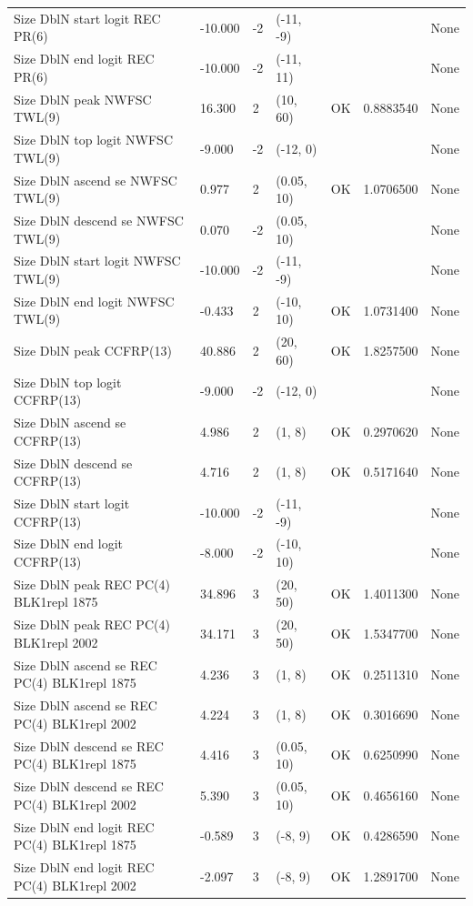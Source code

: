 \documentclass[
  english,
  a4paper,
]{article}
\begin{document}
\begin{landscape}
\begin{longtable}[t]{>{\raggedright\arraybackslash}p{8.5cm}lllll>{\raggedright\arraybackslash}p{4cm}}
Size DblN start logit REC PR(6) & -10.000 & -2 & (-11, -9) &  &  & None\\
Size DblN end logit REC PR(6) & -10.000 & -2 & (-11, 11) &  &  & None\\
Size DblN peak NWFSC TWL(9) & 16.300 & 2 & (10, 60) & OK & 0.8883540 & None\\
Size DblN top logit NWFSC TWL(9) & -9.000 & -2 & (-12, 0) &  &  & None\\
Size DblN ascend se NWFSC TWL(9) & 0.977 & 2 & (0.05, 10) & OK & 1.0706500 & None\\
Size DblN descend se NWFSC TWL(9) & 0.070 & -2 & (0.05, 10) &  &  & None\\
Size DblN start logit NWFSC TWL(9) & -10.000 & -2 & (-11, -9) &  &  & None\\
Size DblN end logit NWFSC TWL(9) & -0.433 & 2 & (-10, 10) & OK & 1.0731400 & None\\
Size DblN peak CCFRP(13) & 40.886 & 2 & (20, 60) & OK & 1.8257500 & None\\
Size DblN top logit CCFRP(13) & -9.000 & -2 & (-12, 0) &  &  & None\\
Size DblN ascend se CCFRP(13) & 4.986 & 2 & (1, 8) & OK & 0.2970620 & None\\
Size DblN descend se CCFRP(13) & 4.716 & 2 & (1, 8) & OK & 0.5171640 & None\\
Size DblN start logit CCFRP(13) & -10.000 & -2 & (-11, -9) &  &  & None\\
Size DblN end logit CCFRP(13) & -8.000 & -2 & (-10, 10) &  &  & None\\
Size DblN peak REC PC(4) BLK1repl 1875 & 34.896 & 3 & (20, 50) & OK & 1.4011300 & None\\
Size DblN peak REC PC(4) BLK1repl 2002 & 34.171 & 3 & (20, 50) & OK & 1.5347700 & None\\
Size DblN ascend se REC PC(4) BLK1repl 1875 & 4.236 & 3 & (1, 8) & OK & 0.2511310 & None\\
Size DblN ascend se REC PC(4) BLK1repl 2002 & 4.224 & 3 & (1, 8) & OK & 0.3016690 & None\\
Size DblN descend se REC PC(4) BLK1repl 1875 & 4.416 & 3 & (0.05, 10) & OK & 0.6250990 & None\\
Size DblN descend se REC PC(4) BLK1repl 2002 & 5.390 & 3 & (0.05, 10) & OK & 0.4656160 & None\\
Size DblN end logit REC PC(4) BLK1repl 1875 & -0.589 & 3 & (-8, 9) & OK & 0.4286590 & None\\
Size DblN end logit REC PC(4) BLK1repl 2002 & -2.097 & 3 & (-8, 9) & OK & 1.2891700 & None\\

\end{longtable}
\end{landscape}
\end{document}
